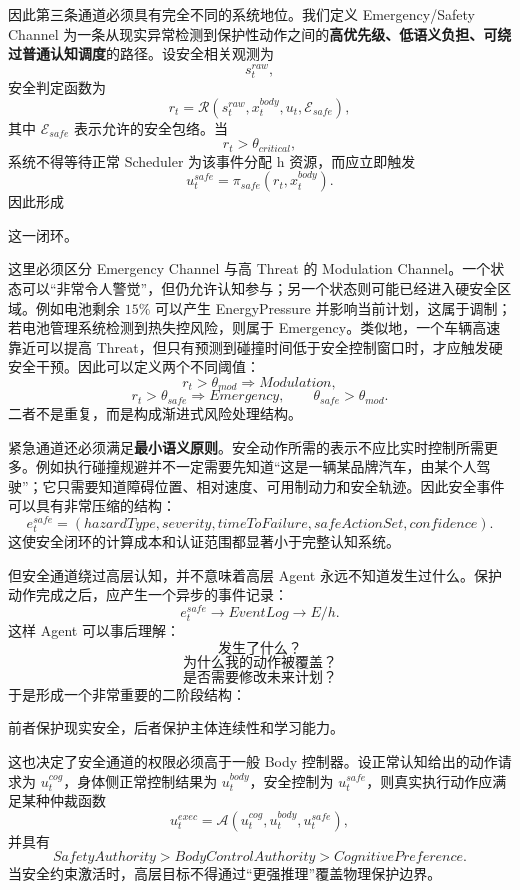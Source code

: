 因此第三条通道必须具有完全不同的系统地位。我们定义 Emergency/Safety Channel 为一条从现实异常检测到保护性动作之间的\textbf{高优先级、低语义负担、可绕过普通认知调度}的路径。设安全相关观测为
\[
s_t^{raw},
\]
安全判定函数为
\[
r_t
=
\mathcal{R}
\left(
s_t^{raw},
x_t^{body},
u_t,
\mathcal{E}_{safe}
\right),
\]
其中 $\mathcal{E}_{safe}$ 表示允许的安全包络。当
\[
r_t>\theta_{critical},
\]
系统不得等待正常 Scheduler 为该事件分配 h 资源，而应立即触发
\[
u_t^{safe}
=
\pi_{safe}(r_t,x_t^{body}).
\]
因此形成
\begin{statementbox}
\centering
{}
\end{statementbox}
这一闭环。

这里必须区分 Emergency Channel 与高 Threat 的 Modulation Channel。一个状态可以“非常令人警觉”，但仍允许认知参与；另一个状态则可能已经进入硬安全区域。例如电池剩余 $15\%$ 可以产生 EnergyPressure 并影响当前计划，这属于调制；若电池管理系统检测到热失控风险，则属于 Emergency。类似地，一个车辆高速靠近可以提高 Threat，但只有预测到碰撞时间低于安全控制窗口时，才应触发硬安全干预。因此可以定义两个不同阈值：
\[
r_t>\theta_{mod}
\Rightarrow
Modulation,
\]
\[
r_t>\theta_{safe}
\Rightarrow
Emergency,
\qquad
\theta_{safe}>\theta_{mod}.
\]
二者不是重复，而是构成渐进式风险处理结构。

紧急通道还必须满足\textbf{最小语义原则}。安全动作所需的表示不应比实时控制所需更多。例如执行碰撞规避并不一定需要先知道“这是一辆某品牌汽车，由某个人驾驶”；它只需要知道障碍位置、相对速度、可用制动力和安全轨迹。因此安全事件可以具有非常压缩的结构：
\[
e_t^{safe}
=
(
hazardType,
severity,
timeToFailure,
safeActionSet,
confidence
).
\]
这使安全闭环的计算成本和认证范围都显著小于完整认知系统。

但安全通道绕过高层认知，并不意味着高层 Agent 永远不知道发生过什么。保护动作完成之后，应产生一个异步的事件记录：
\[
e_t^{safe}
\rightarrow
EventLog
\rightarrow
E/h.
\]
这样 Agent 可以事后理解：
\[
\text{发生了什么？}
\]
\[
\text{为什么我的动作被覆盖？}
\]
\[
\text{是否需要修改未来计划？}
\]
于是形成一个非常重要的二阶段结构：
\begin{statementbox}
\centering
{}
\end{statementbox}
前者保护现实安全，后者保护主体连续性和学习能力。

这也决定了安全通道的权限必须高于一般 Body 控制器。设正常认知给出的动作请求为 $u_t^{cog}$，身体侧正常控制结果为 $u_t^{body}$，安全控制为 $u_t^{safe}$，则真实执行动作应满足某种仲裁函数
\[
u_t^{exec}
=
\mathcal{A}
\left(
u_t^{cog},
u_t^{body},
u_t^{safe}
\right),
\]
并具有
\[
SafetyAuthority
>
BodyControlAuthority
>
CognitivePreference.
\]
当安全约束激活时，高层目标不得通过“更强推理”覆盖物理保护边界。

